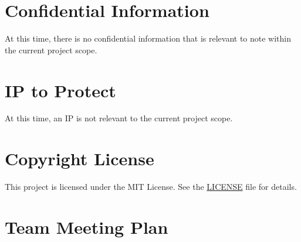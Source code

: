 \documentclass{article}
\begin{document}
\section{Confidential Information}

At this time, there is no confidential information that is relevant to note within the current project scope.

\section{IP to Protect}

At this time, an IP is not relevant to the current project scope.

\section{Copyright License}

This project is licensed under the MIT License. See the \href{./LICENSE}{LICENSE} file for details.

\section{Team Meeting Plan}

\iffalse
{}



\end{document}
